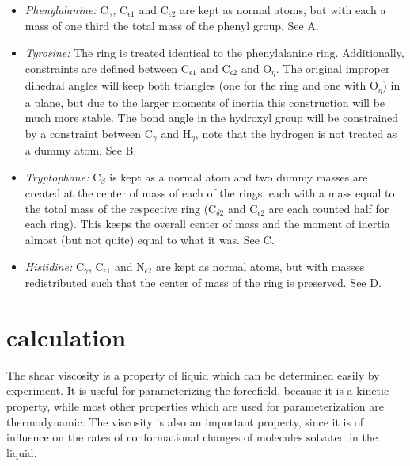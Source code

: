 \begin{itemize}

\item{\em Phenylalanine:\/} {\sf C}$_\gamma$, {\sf C}$_{{\epsilon}1}$
and {\sf C}$_{{\epsilon}2}$ are kept as normal atoms, but with each a
mass of one third the total mass of the phenyl group. See
A.

\item{\em Tyrosine:\/} The ring is treated identical to the
phenylalanine ring. Additionally, constraints are defined between {\sf
C}$_{{\epsilon}1}$ and {\sf C}$_{{\epsilon}2}$ and {\sf O}$_{\eta}$.
The original improper dihedral angles will keep both triangles (one
for the ring and one with {\sf O}$_{\eta}$) in a plane, but due to the
larger moments of inertia this construction will be much more
stable. The bond angle in the hydroxyl group will be constrained by a
constraint between {\sf C}$_\gamma$ and {\sf H}$_{\eta}$, note that
the hydrogen is not treated as a dummy atom. See
B.

\item{\em Tryptophane:\/} {\sf C}$_\beta$ is kept as a normal atom
and two dummy masses are created at the center of mass of each of the
rings, each with a mass equal to the total mass of the respective ring
({\sf C}$_{{\delta}2}$ and {\sf C}$_{{\epsilon}2}$ are each
counted half for each ring). This keeps the overall center of mass and
the moment of inertia almost (but not quite) equal to what it was. See
C.

\item{\em Histidine:\/} {\sf C}$_\gamma$, {\sf C}$_{{\epsilon}1}$
and {\sf N}$_{{\epsilon}2}$ are kept as normal atoms, but with masses
redistributed such that the center of mass of the ring is
preserved. See D.

\end{itemize}

\section{ calculation}

The shear viscosity is a property of liquid which can be determined easily  
by experiment. It is useful for parameterizing the forcefield,
because it is a kinetic property, while most other properties
which are used for parameterization are thermodynamic.
The viscosity is also an important property, since it is of influence on
the rates of conformational changes of molecules solvated in the liquid.

